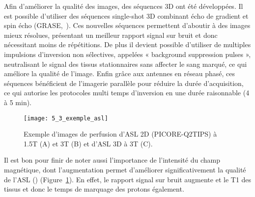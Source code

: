 Afin d’améliorer la qualité des images, des séquences 3D ont été développées. Il est possible d’utiliser des séquences single-shot 3D combinant écho de gradient et spin écho (GRASE,~\cite{Gunther2005}). Ces nouvelles séquences permettent d’aboutir à des images mieux résolues, présentant un meilleur rapport signal sur bruit et donc nécessitant moins de répétitions. De plus il devient possible d’utiliser de multiples impulsions d’inversion non sélectives, appelées « background suppression pulses », neutralisant le signal des tissus stationnaires sans affecter le sang marqué, ce qui améliore la qualité de l’image. Enfin grâce aux antennes en réseau phasé, ces séquences bénéficient de l’imagerie parallèle pour réduire la durée d’acquisition, ce qui autorise les protocoles multi temps d’inversion en une durée raisonnable (4 à 5 min).\\
\begin{figure}[!t]
\centering
\texttt{[image: 5\_3\_exemple\_asl]}
\caption{Exemple d'images de perfusion d’ASL 2D (PICORE-Q2TIPS) à 1.5T (A) et 3T (B) et d’ASL 3D à 3T (C).}
\label{fig:5_3_exemple_asl}	
\end{figure}
Il est bon pour finir de noter aussi l’importance de l’intensité du champ magnétique, dont l’augmentation permet d’améliorer significativement la qualité de l’ASL (\cite{Golay2006}) (Figure~\ref{fig:5_3_exemple_asl}). En effet, le rapport signal sur bruit augmente et le T1 des tissus et donc le temps de marquage des protons également.
